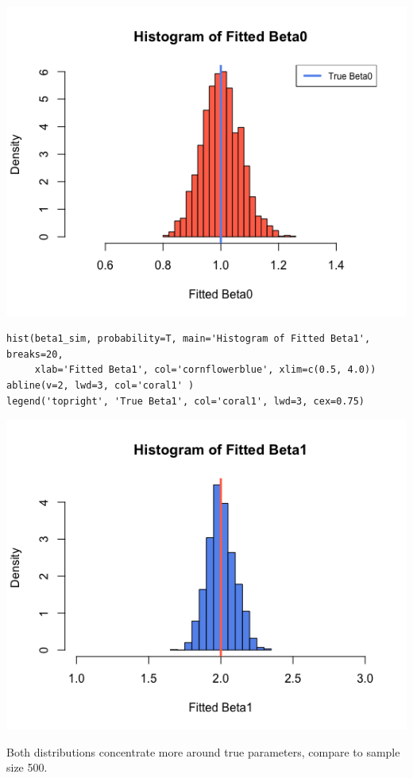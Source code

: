 \documentclass[12pt,letterpaper]{article}
\begin{document}
\includegraphics[width=150mm]{hist_beta0_2.png}

\begin{verbatim}
hist(beta1_sim, probability=T, main='Histogram of Fitted Beta1', breaks=20,
     xlab='Fitted Beta1', col='cornflowerblue', xlim=c(0.5, 4.0))
abline(v=2, lwd=3, col='coral1' )
legend('topright', 'True Beta1', col='coral1', lwd=3, cex=0.75)
\end{verbatim}

\includegraphics[width=150mm]{hist_beta1_2.png}

\noindent Both distributions concentrate more around true parameters, compare to sample size 500.
\end{document}
